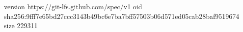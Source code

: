 version https://git-lfs.github.com/spec/v1
oid sha256:9fff7e65bd27ccc3143b49bc6e7ba7bff57503b06d571ed05cab28baf9519674
size 229311
